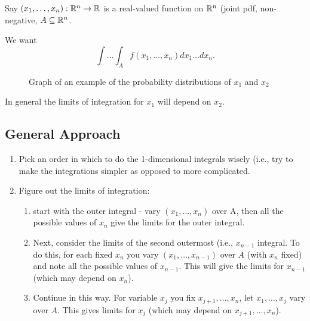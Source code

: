 
Say $\left( x_1, \ldots, x_{n} \right) : \mathbb{R}^{n} \to \mathbb{R} $ is a real-valued function on $\mathbb{R}^{n}$ (joint pdf, non-negative, $A \subseteq \mathbb{R}^{n}$. 

We want 
\[
	\int \ldots \int_{A} f\left( x_1, \ldots, x_{n} \right) dx_1 \ldots dx_{n}
.\] 
\begin{figure}[ht]
    \centering
    \caption{Graph of an example of the probability distributions of $x_1$ and $x_2$}
    \label{fig:xonextwograph}
\end{figure}


In general the limits of integration for $x_1$ will depend on $x_2$. 

\subsection{General Approach}

\begin{enumerate}
	\item Pick an order in which to do the 1-dimensional integrals wisely (i.e., try to make the integrations simpler as opposed to more complicated. 
	\item Figure out the limits of integration: 
		\begin{enumerate}
			\item start with the outer integral - vary $(x_1, \ldots, x_{n})$ over A, then all the possible values of $x_{n}$ give the limits for the outer integral. 
			\item Next, consider the limits of the second outermost (i.e., $x_{n-1}$ integral. To do this, for each fixed $x_{n}$ you vary $\left( x_1, \ldots, x_{n-1} \right) $ over $A$ (with $x_{n}$ fixed) and note all the possible values of $x_{n-1}$. This will give the limits for $x_{n-1}$ (which may depend on $x_{n}$).
			\item Continue in this way. For variable $x_{j}$ you fix $x_{j+1}, \ldots, x_{n}$, let $x_1, \ldots, x_{j}$ vary over $A$. This gives limits for $x_{j}$ (which may depend on $x_{j + 1}, \ldots, x_{n}$). 
		\end{enumerate}
\end{enumerate}

